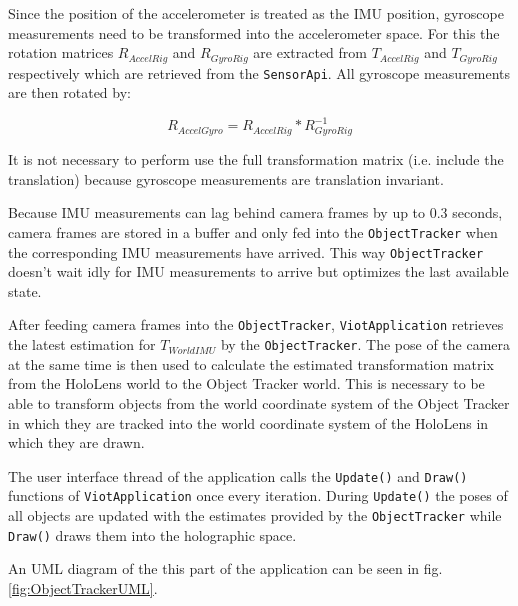 Since the position of the accelerometer is treated as the IMU position, gyroscope measurements need to be transformed into the accelerometer space. For this the rotation matrices $R_{AccelRig}$ and $R_{GyroRig}$ are extracted from $T_{AccelRig}$ and $T_{GyroRig}$ respectively which are retrieved from the \lstinline{SensorApi}. All gyroscope measurements are then rotated by:

\begin{equation*}
    R_{AccelGyro} = R_{AccelRig} * R_{GyroRig}^{-1}
\end{equation*}

It is not necessary to perform use the full transformation matrix (i.e. include the translation) because gyroscope measurements are translation invariant.

Because IMU measurements can lag behind camera frames by up to 0.3 seconds, camera frames are stored in a buffer and only fed into the \lstinline{ObjectTracker} when the corresponding IMU measurements have arrived. This way \lstinline{ObjectTracker} doesn't wait idly for IMU measurements to arrive but optimizes the last available state. 

After feeding camera frames into the \lstinline{ObjectTracker}, \lstinline{ViotApplication} retrieves the latest estimation for $T_{WorldIMU}$ by the \lstinline{ObjectTracker}. The pose of the camera at the same time is then used to calculate the estimated transformation matrix from the HoloLens world to the Object Tracker world. This is necessary to be able to transform objects from the world coordinate system of the Object Tracker in which they are tracked into the world coordinate system of the HoloLens in which they are drawn.

The user interface thread of the application calls the \lstinline{Update()} and \lstinline{Draw()} functions of \lstinline{ViotApplication} once every iteration. During \lstinline{Update()} the poses of all objects are updated with the estimates provided by the \lstinline{ObjectTracker} while \lstinline{Draw()} draws them into the holographic space.

An UML diagram of the this part of the application can be seen in fig. \ref{fig:ObjectTrackerUML}.

